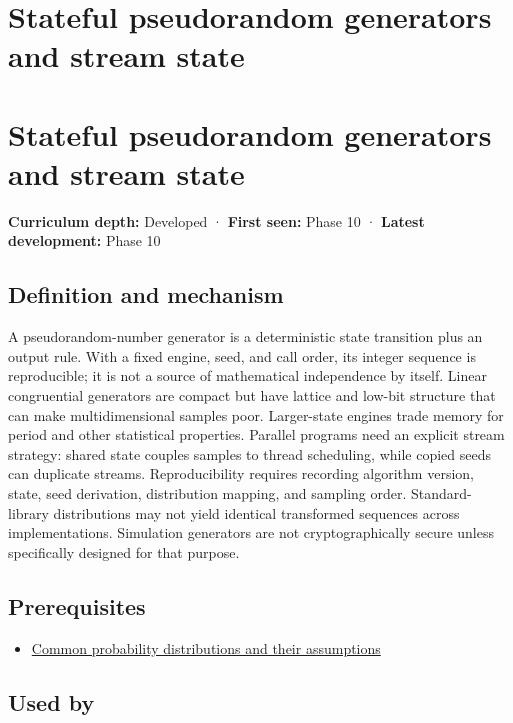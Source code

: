 \hypertarget{appendix-e0f7c7e08f3a}{}
\section*{Stateful pseudorandom generators and stream state}
\section{Stateful pseudorandom generators and stream state}\label{stateful-pseudorandom-generators-and-stream-state}

\textbf{Curriculum depth:} Developed · \textbf{First seen:} Phase 10 · \textbf{Latest development:} Phase 10

\subsection{Definition and mechanism}\label{definition-and-mechanism}

A pseudorandom-number generator is a deterministic state transition plus an output rule. With a fixed engine, seed, and call order, its integer sequence is reproducible; it is not a source of mathematical independence by itself. Linear congruential generators are compact but have lattice and low-bit structure that can make multidimensional samples poor. Larger-state engines trade memory for period and other statistical properties. Parallel programs need an explicit stream strategy: shared state couples samples to thread scheduling, while copied seeds can duplicate streams. Reproducibility requires recording algorithm version, state, seed derivation, distribution mapping, and sampling order. Standard-library distributions may not yield identical transformed sequences across implementations. Simulation generators are not cryptographically secure unless specifically designed for that purpose.

\subsection{Prerequisites}\label{prerequisites}

\begin{itemize}
\tightlist
\item
  \hyperref[appendix-a2360b435383]{Common probability distributions and their assumptions}
\end{itemize}

\subsection{Used by}\label{used-by}

